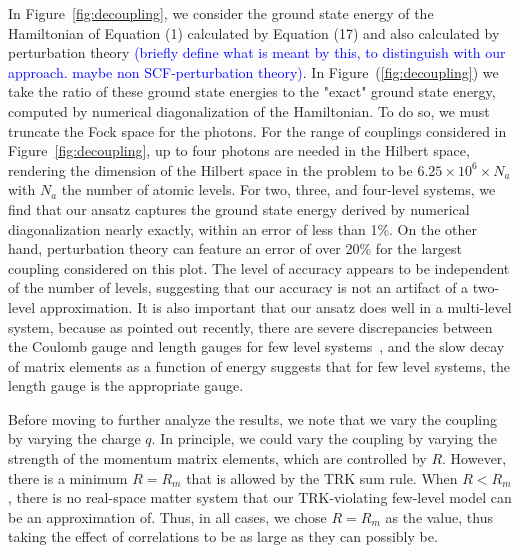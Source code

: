 \documentclass[aps,prb,twocolumn,
	groupedaddress,superscriptaddress,
	amsfonts,amssymb,amsmath,floatfix,
	citeautoscript]{revtex4-1}
\newcommand{\Jadd}[1]{\textcolor{blue}{#1}}
\begin{document}
In Figure~\ref{fig:decoupling}, we consider the ground state energy of the Hamiltonian of Equation (1) calculated by Equation (17) and also calculated by perturbation theory \Jadd{(briefly define what is meant by this, to distinguish with our approach. maybe non SCF-perturbation theory)}. In Figure~(\ref{fig:decoupling}) we take the ratio of these ground state energies to the "exact" ground state energy, computed by numerical diagonalization of the Hamiltonian. To do so, we must truncate the Fock space for the photons. For the range of couplings considered in Figure~\ref{fig:decoupling}, up to four photons are needed in the Hilbert space, rendering the dimension of the Hilbert space in the problem to be $6.25\times10^6 \times N_a$ with $N_a$ the number of atomic levels. For two, three, and four-level systems, we find that our ansatz captures the ground state energy derived by numerical diagonalization nearly exactly, within an error of less than 1\%. On the other hand, perturbation theory can feature an error of over 20\% for the largest coupling considered on this plot. The level of accuracy appears to be independent of the number of levels, suggesting that our accuracy is not an artifact of a two-level approximation. It is also important that our ansatz does well in a multi-level system, because as pointed out recently, there are severe discrepancies between the Coulomb gauge and length gauges for few level systems~\cite{schaefer2018, bernardis2018}, and the slow decay of matrix elements as a function of energy suggests that for few level systems, the length gauge is the appropriate gauge.

Before moving to further analyze the results, we note that we vary the coupling by varying the charge $q$. In principle, we could vary the coupling by varying the strength of the momentum matrix elements, which are controlled by $R$. However, there is a minimum $R=R_{m}$ that is allowed by the TRK sum rule. When $R < R_m$, there is no real-space matter system that our TRK-violating  few-level model can be an approximation of. Thus, in all cases, we chose $R=R_m$ as the value, thus taking the effect of correlations to be as large as they can possibly be.
\end{document}
